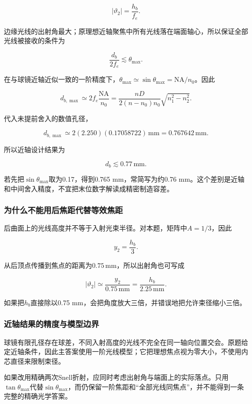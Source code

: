 \documentclass[12pt,a4paper,fontset=fandol]{ctexart}
\begin{document}
\[
|\vartheta_2|=\frac{h_b}{f_e}.
\]

边缘光线的出射角最大；原理想近轴聚焦中所有光线落在端面轴心，所以保证全部光线被接收的条件为

\[
\frac{d_b}{2f_e}\lesssim\theta_{\max}.
\]

在与球镜近轴近似一致的一阶精度下，\(\theta_{\max}\simeq\sin\theta_{\max}=\mathrm{NA}/n_0\)。因此

\[
\boxed{
d_{b,\max}\simeq2f_e\frac{\mathrm{NA}}{n_0}
=\frac{nD}{2(n-n_0)n_0}
\sqrt{n_1^2-n_2^2}}.
\]

代入未提前舍入的数值孔径，

\[
d_{b,\max}\simeq
2(2.250)(0.17058722)\,\mathrm{mm}
=0.767642\,\mathrm{mm}.
\]

所以近轴设计结果为

\[
\boxed{d_b\lesssim0.77\,\mathrm{mm}}.
\]

若先把\(\sin\theta_{\max}\)取为0.17，得到0.765 mm，常简写为约0.76
mm。这个差别是近轴和中间舍入精度，不宜把末位数字解读成精密制造容差。

\subsubsection{为什么不能用后焦距代替等效焦距}\label{ux4e3aux4ec0ux4e48ux4e0dux80fdux7528ux540eux7126ux8dddux4ee3ux66ffux7b49ux6548ux7126ux8ddd}

后曲面上的光线高度并不等于入射光束半径。对本题，矩阵中\(A=1/3\)，因此

\[
y_2=\frac{h_b}{3}.
\]

从后顶点传播到焦点的距离为\(0.75\,\mathrm{mm}\)，所以出射角也可写成

\[
|\vartheta_2|
\simeq\frac{y_2}{0.75\,\mathrm{mm}}
=\frac{h_b}{2.25\,\mathrm{mm}}.
\]

如果把\(h_b\)直接除以0.75
mm，会把角度放大三倍，并错误地把允许束径缩小三倍。

\subsubsection{近轴结果的精度与模型边界}\label{ux8fd1ux8f74ux7ed3ux679cux7684ux7cbeux5ea6ux4e0eux6a21ux578bux8fb9ux754c}

球镜有限孔径存在球差，不同入射高度的光线不完全在同一轴向位置交会。原题给定近轴条件，因此主答案使用一阶光线模型；它把理想焦点视为零大小，不使用内芯直径来限制束径。

如果改用精确两次Snell折射，应同时考虑出射角与端面上的实际落点。只用\(\tan\theta_{\max}\)代替\(\sin\theta_{\max}\)，而仍保留一阶焦距和``全部光线同焦点''，并不能得到一条完整的精确光学答案。
\end{document}
